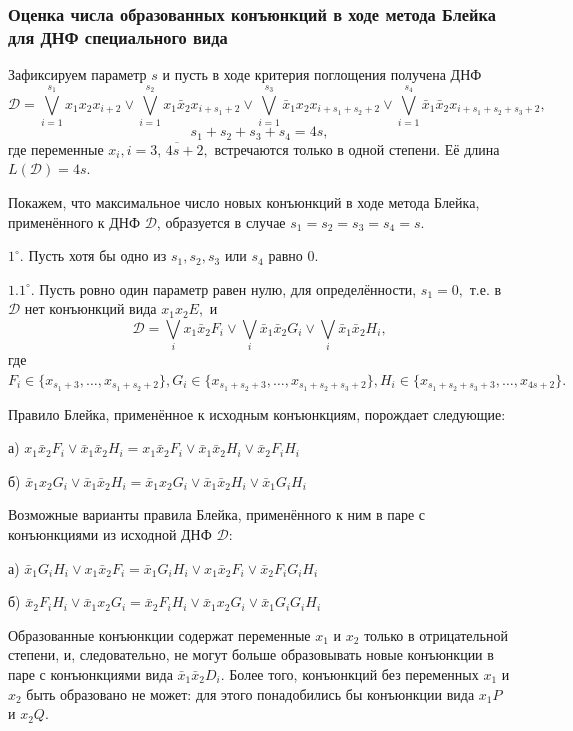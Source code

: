 \documentclass[12pt,a4paper,oneside,fleqn,leqno]{article}
\theoremstyle{definition}
\begin{document}
	\subsubsection*{Оценка числа образованных конъюнкций в ходе метода Блейка для ДНФ специального вида}
			Зафиксируем параметр $s$ и пусть в ходе критерия поглощения получена ДНФ
			$$
				\mathcal{D} = \bigvee\limits_{i = 1}^{s_1}x_1x_2x_{i +2} \vee \bigvee\limits_{i = 1}^{s_2}x_1\bar{x}_2x_{i + s_1 + 2} \vee \bigvee\limits_{i = 1}^{s_3}\bar{x}_1x_2x_{i + s_1 + s_2 + 2} \vee \bigvee\limits_{i = 1}^{s_4}\bar{x}_1\bar{x}_2x_{i + s_1 + s_2 + s_3 + 2},
			$$
			$$
				s_1 + s_2 + s_3 + s_4 = 4s,
			$$
			где переменные $x_i, i = \overline{3,\,4s+2},$ встречаются только в одной степени. Её длина $L(\mathcal{D}) = 4s.$\par
			Покажем, что максимальное число новых конъюнкций в ходе метода Блейка, применённого к ДНФ $\mathcal{D}$, образуется в случае $s_1 = s_2 = s_3 = s_4 = s.$\par
			$1^{\circ}.$ Пусть хотя бы одно из $s_1, s_2, s_3$ или $s_4$ равно 0.\par
			$1.1^{\circ}.$ Пусть ровно один параметр равен нулю, для определённости, $s_1 = 0,$ т.е. в $\mathcal{D}$ нет конъюнкций вида $x_1x_2E,$ и
			$$\mathcal{D} = \bigvee_ix_1\bar{x}_2F_i \vee \bigvee_i\bar{x}_1\bar{x}_2G_i \vee \bigvee_i\bar{x}_1\bar{x}_2H_i,$$
			где $F_i \in \{x_{s_1 + 3}, \ldots, x_{s_1 + s_2 + 2}\}, G_i \in \{x_{s_1 + s_2 + 3}, \ldots, x_{s_1 + s_2 + s_3 + 2}\}, H_i \in \{x_{s_1 + s_2  + s_3 + 3}, \ldots, x_{4s + 2}\}.$\par
			Правило Блейка, применённое к исходным конъюнкциям, порождает следующие:\par
			а) $x_1\bar{x}_2F_i \vee \bar{x}_1\bar{x}_2H_i = x_1\bar{x}_2F_i \vee \bar{x}_1\bar{x}_2H_i \vee \bar{x}_2F_iH_i$\par
			б) $\bar{x}_1x_2G_i \vee \bar{x}_1\bar{x}_2H_i = \bar{x}_1x_2G_i \vee \bar{x}_1\bar{x}_2H_i \vee \bar{x}_1G_iH_i$\par
			Возможные варианты правила Блейка, применённого к ним в паре с конъюнкциями из исходной ДНФ $\mathcal{D}:$\par
			а) $\bar{x}_1G_iH_i \vee x_1\bar{x}_2F_i = \bar{x}_1G_iH_i \vee x_1\bar{x}_2F_i \vee \bar{x}_2F_iG_iH_i$\par
			б) $\bar{x}_2F_iH_i \vee \bar{x}_1x_2G_i = \bar{x}_2F_iH_i \vee \bar{x}_1x_2G_i \vee \bar{x}_1G_iG_iH_i$\par
			Образованные конъюнкции содержат переменные $x_1$ и $x_2$ только в отрицательной степени, и, следовательно, не могут больше образовывать новые конъюнкции в паре с конъюнкциями вида $\bar{x}_1\bar{x}_2D_i.$ Более того, конъюнкций без переменных $x_1$ и $x_2$ быть образовано не может: для этого понадобились бы конъюнкции вида $x_1P$ и $x_2Q.$\par
\end{document}
